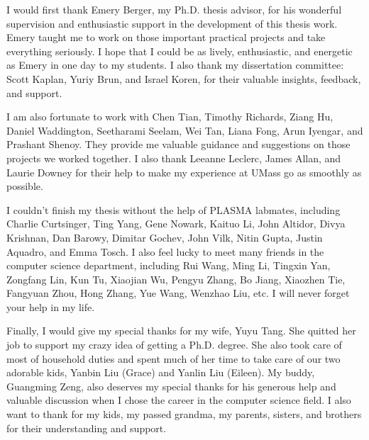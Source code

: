 I would first thank Emery Berger, my Ph.D. thesis advisor, for his wonderful supervision and enthusiastic support in the development of this thesis work. Emery taught me to work on those important practical projects and take everything seriously. I hope that I could be as lively, enthusiastic, and energetic as Emery in one day to my students. I also thank my dissertation committee: Scott Kaplan, Yuriy Brun, and Israel Koren, for their valuable insights, feedback, and support. 

I am also fortunate to work with Chen Tian, Timothy Richards, Ziang Hu, Daniel Waddington, Seetharami Seelam, Wei Tan, Liana Fong, Arun Iyengar, and Prashant Shenoy. They provide me valuable guidance and suggestions on those projects we worked together. I also thank Leeanne Leclerc, James Allan, and Laurie Downey for their help to make my experience at UMass go as smoothly as possible. 

I couldn't finish my thesis without the help of PLASMA  labmates, including Charlie Curtsinger, Ting Yang, Gene Nowark, Kaituo Li, John Altidor, Divya Krishnan, Dan Barowy, Dimitar Gochev, John Vilk, Nitin Gupta, Justin Aquadro, and Emma Tosch. I also feel lucky to meet many friends in the computer science department, including Rui Wang, Ming Li, Tingxin Yan, Zongfang Lin, Kun Tu, Xiaojian Wu, Pengyu Zhang, Bo Jiang, Xiaozhen Tie, Fangyuan Zhou, Hong Zhang, Yue Wang, Wenzhao Liu, etc. I will never forget your help in my life. 

Finally, I would give my special thanks for my wife, Yuyu Tang. She quitted her job to support my crazy idea of getting a Ph.D. degree. She also took care of most of household duties and spent much of her time to take care of our two adorable kids, Yanbin Liu (Grace) and Yanlin Liu (Eileen). My buddy, Guangming Zeng, also deserves my special thanks for his generous help and valuable discussion when I chose the career in the computer science field. I also want to thank for my kids, my passed grandma, my parents, sisters, and brothers for their understanding and support.    


